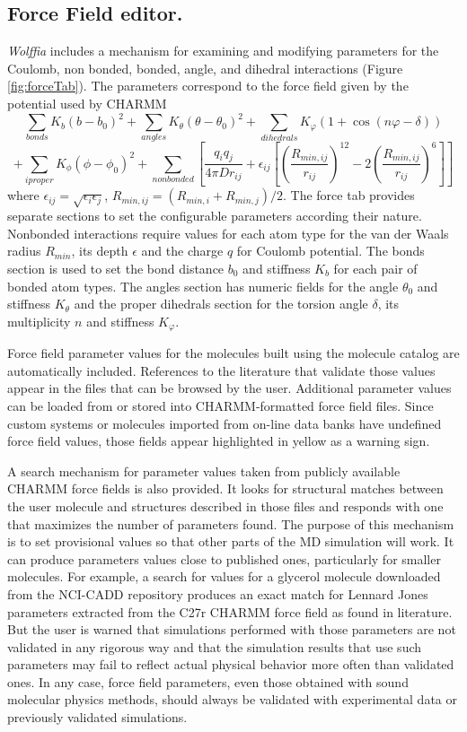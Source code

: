 \documentclass{article}
\begin{document}
\subsection{Force Field editor.}
\textit{Wolffia} includes a mechanism for examining and modifying parameters for the Coulomb, non bonded, bonded, angle, and dihedral interactions (Figure \ref{fig:forceTab}). The parameters correspond to the force field given by the potential used by CHARMM
\[  \sum _ {bonds}  K_b(b-b_0)^2 + \sum _{angles} K_\theta (\theta-\theta_0)^2 +
 \sum_{dihedrals} K_\varphi (1+\cos(n\varphi-\delta))
\]
\[ + \sum_{iproper} K_\phi(\phi-\phi_0)^2 + \sum_{nonbonded} \left[ \frac{q_i q_j}{4\pi D r_{ij}} + \epsilon_{ij} \left [ \left (\frac{R_{min,ij}}{r_{ij}} \right)^{12} - 2 \left (\frac{R_{min,{ij}}}{r_{ij}} \right)^6 \right ]\right] \]
where $\epsilon_{ij} = \sqrt{\epsilon_{i}\epsilon_{j}}$, $R_{min,{ij}} = (R_{min,{i}} + R_{min,{j}})/2$.  The force tab provides separate sections to set the configurable parameters according their nature.  Nonbonded interactions require values for each atom type for the van der Waals radius $R_{min}$, its depth $\epsilon$ and the charge $q$ for Coulomb potential.  The bonds section is used to set the bond distance $b_0$ and stiffness $K_b$ for each pair of bonded atom types. The angles section has numeric fields for the angle $\theta_0$ and stiffness $K_\theta$ and the proper dihedrals section for the torsion angle $\delta$, its multiplicity $n$ and stiffness $K_\varphi$.  

Force field parameter values for the molecules built using the molecule catalog are automatically included.  References to the literature that validate those values appear in the files that can be browsed by the user.  Additional parameter values can be loaded from or stored into CHARMM-formatted force field files.  Since custom systems or molecules imported from on-line data banks have undefined force field values, those fields appear highlighted in yellow as a warning sign. 

A search mechanism for parameter values taken from publicly available CHARMM force fields is also provided.  It looks for structural matches between the user molecule and structures described in those files and responds with one that maximizes the number of parameters found.  The purpose of this mechanism is to set provisional values so that other parts of the MD simulation will work.  It can produce parameters values close to published ones, particularly for smaller molecules. For example, a search for values for a glycerol molecule downloaded from the NCI-CADD repository produces an exact match for Lennard Jones parameters extracted from  the C27r CHARMM force field as found in literature.\cite{Pastor}  But the user is warned that simulations performed with those parameters are not validated in any rigorous way and that the simulation results that use such parameters may fail to reflect actual physical behavior more often than validated ones.  In any case, force field parameters, even those obtained with sound molecular physics methods, should always be validated with experimental data or previously validated simulations.
\end{document}
